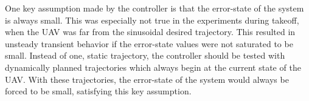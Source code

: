 One key assumption made by the controller is that the
error-state of the system is always small. This was
especially not true in the experiments during takeoff, when the UAV was far from the sinusoidal
desired trajectory.
This resulted in unsteady transient behavior if the error-state values were
not saturated to be small.
Instead of one, static trajectory,
the controller should be tested with
dynamically planned trajectories which always begin at the current state of the
UAV. With these trajectories, the error-state of the system would always be forced to
be small, satisfying this key assumption.

